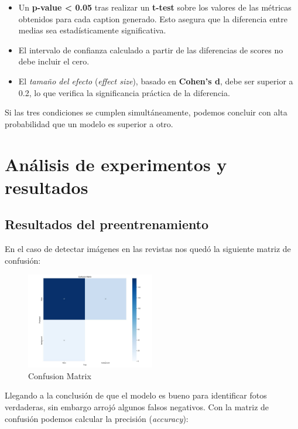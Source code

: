 \documentclass[14pt]{extarticle}
\begin{document}
\begin{itemize}
    \item Un \textbf{p-value < 0.05} tras realizar un \textbf{t-test} sobre los valores de las métricas obtenidos para cada caption generado. Esto asegura que la diferencia entre medias sea estadísticamente significativa.
    \item El intervalo de confianza calculado a partir de las diferencias de scores no debe incluir el cero.
    \item El \textit{tamaño del efecto} (\textit{effect size}), basado en \textbf{Cohen's d}, debe ser superior a 0.2, lo que verifica la significancia práctica de la diferencia.
\end{itemize}

Si las tres condiciones se cumplen simultáneamente, podemos concluir con alta probabilidad que un modelo es superior a otro.

\section{Análisis de experimentos y resultados}

\subsection{Resultados del preentrenamiento}

En el caso de detectar imágenes en las revistas nos quedó la siguiente matriz de confusión:

\begin{figure}[h]
    \centering
    \includegraphics[width=0.5\textwidth]{./images/photo_2025-01-31_02-27-49.jpg}
    \caption{Confusion Matrix}
    \label{fig:confusion}
\end{figure}

Llegando a la conclusión de que el modelo es bueno para identificar fotos verdaderas, sin embargo arrojó algunos falsos negativos.
Con la matriz de confusión podemos calcular la precisión (\textit{accuracy}):
\end{document}

